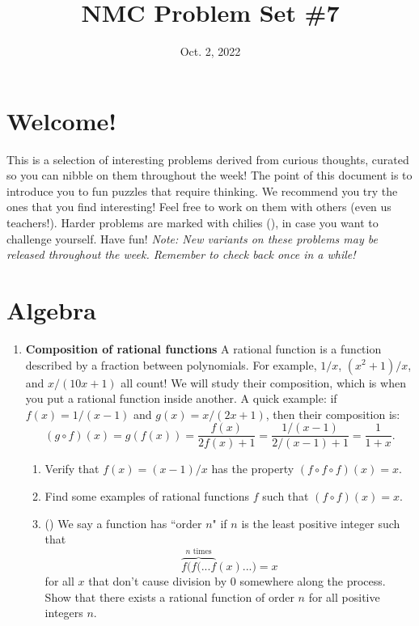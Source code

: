 \documentclass[11pt]{scrartcl}
\begin{document}
\title{NMC Problem Set \#7}
\date{Oct. 2, 2022}
\maketitle

\section*{Welcome!}

This is a selection of interesting problems derived from curious thoughts, curated so you can nibble on them throughout the week! The point of this document is to introduce you to fun puzzles that require thinking. We recommend you try the ones that you find interesting! Feel free to work on them with others (even us teachers!). Harder problems are marked with chilies (\fullchili), in case you want to challenge yourself.
\newline\newline
Have fun! \textit{Note: New variants on these problems may be released throughout the week. Remember to check back once in a while!}
    
\section{Algebra}
\begin{enumerate}[label=\textbf{A\arabic*}.]
    \item \textbf{Composition of rational functions} \newline
    A rational function is a function described by a fraction between polynomials. For example, $1/x$, $(x^2+1)/x$, and $x/(10x+1)$ all count! We will study their composition, which is when you put a rational function inside another. A quick example: if $f(x) = 1/(x-1)$ and $g(x) = x/(2x+1)$, then their composition is:
    \[ (g\circ f)(x) = g(f(x)) = \frac{f(x)}{2f(x)+1} = \frac{1/(x-1)}{2/(x-1) + 1} = \frac{1}{1+x}. \]
    \begin{enumerate}
        \item Verify that $f(x) = (x-1)/x$ has the property $(f \circ f \circ f)(x) = x$.
        \item Find some examples of rational functions $f$ such that $(f \circ f)(x) = x$.
        \item (\fullchili) We say a function has ``order $n$" if $n$ is the least positive integer such that
        $$\overbrace{f(f(...f}^\text{$n$ times}(x)...) = x$$
        for all $x$ that don't cause division by $0$ somewhere along the process. Show that there exists a rational function of order $n$ for all positive integers $n$.
    \end{enumerate}
\end{enumerate}
\end{document}
